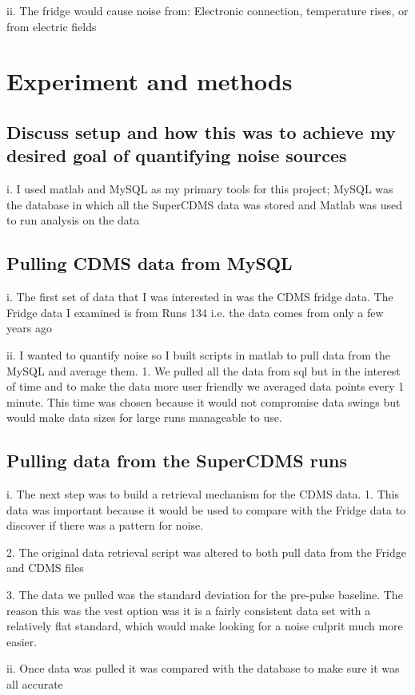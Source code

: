 ii.	The fridge would cause noise from: Electronic connection, temperature rises, or from electric fields

\section{Experiment and methods} 

\subsection{Discuss setup and how this was to achieve my desired goal of quantifying noise sources}
i.	I used matlab and MySQL as my primary tools for this project; MySQL was the database in which all the SuperCDMS data was stored and Matlab was used to run analysis on the data

\subsection{Pulling CDMS data from MySQL}
i.	The first set of data that I was interested in was the CDMS fridge data. The Fridge data I examined is from Runs 134 i.e. the data comes from only a few years ago

ii.	I wanted to quantify noise so I built scripts in matlab to pull data from the MySQL and average them.
1.	We pulled all the data from sql but in the interest of time and to make the data more user friendly we averaged data points every 1 minute. This time was chosen because it would not compromise data swings but would make data sizes for large runs manageable to use. 

\subsection{Pulling data from the SuperCDMS runs}
i.	The next step was to build a retrieval mechanism for the CDMS data. 
1.	This data was important because it would be used to compare with the Fridge data to discover if there was a pattern for noise.

2.	The original data retrieval script was altered to both pull data from the Fridge and CDMS files

3.	The data we pulled was the standard deviation for the pre-pulse baseline. The reason this was the vest option was it is a fairly consistent data set with a relatively flat standard, which would make looking for a noise culprit much more easier. 

ii.	Once data was pulled it was compared with the database to make sure it was all accurate


